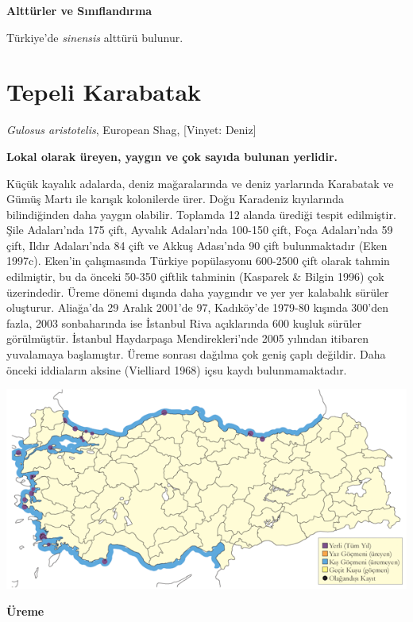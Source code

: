 \documentclass[
  letterpaper,
  DIV=11,
  numbers=noendperiod]{scrreprt}
\begin{document}
\textbf{Alttürler ve Sınıflandırma}

Türkiye'de \emph{sinensis} alttürü bulunur.

\section{Tepeli Karabatak}\label{tepeli-karabatak}

\emph{Gulosus aristotelis}, European Shag, {[}Vinyet: Deniz{]}

\textbf{Lokal olarak üreyen, yaygın ve çok sayıda bulunan yerlidir.}

Küçük kayalık adalarda, deniz mağaralarında ve deniz yarlarında
Karabatak ve Gümüş Martı ile karışık kolonilerde ürer. Doğu Karadeniz
kıyılarında bilindiğinden daha yaygın olabilir. Toplamda 12 alanda
ürediği tespit edilmiştir. Şile Adaları'nda 175 çift, Ayvalık
Adaları'nda 100-150 çift, Foça Adaları'nda 59 çift, Ildır Adaları'nda 84
çift ve Akkuş Adası'nda 90 çift bulunmaktadır (Eken 1997c). Eken'in
çalışmasında Türkiye popülasyonu 600-2500 çift olarak tahmin edilmiştir,
bu da önceki 50-350 çiftlik tahminin (Kasparek \& Bilgin 1996) çok
üzerindedir. Üreme dönemi dışında daha yaygındır ve yer yer kalabalık
sürüler oluşturur. Aliağa'da 29 Aralık 2001'de 97, Kadıköy'de 1979-80
kışında 300'den fazla, 2003 sonbaharında ise İstanbul Riva açıklarında
600 kuşluk sürüler görülmüştür. İstanbul Haydarpaşa Mendirekleri'nde
2005 yılından itibaren yuvalamaya başlamıştır. Üreme sonrası dağılma çok
geniş çaplı değildir. Daha önceki iddiaların aksine (Vielliard 1968)
içsu kaydı bulunmamaktadır.

\includegraphics{images/harita_Page_078.png}

\textbf{Üreme}
\end{document}
